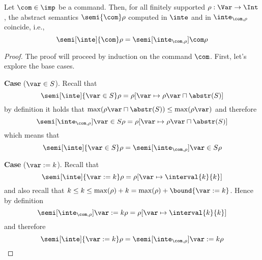
\begin{lemma}
  Let \(\com\in \imp\) be a command. Then, for all finitely supported
  \(\rho : \Var \to \Int\), the abstract semantics
  \(\semi{\com} \rho \)
  computed in \(\inte\) and in \(\inte_{\com,\rho}\)
  coincide, i.e., 
  \begin{equation*}
    \semi[\inte]{\com}\rho = \semi[\inte_{\com,\rho}]{\com}\rho
  \end{equation*}
\end{lemma}

\begin{proof}
  The proof will proceed by induction on the command \(\com\). First,
  let's explore the base cases.

  \medskip

  \textbf{Case} (\(\var \in S\)).
  Recall that
  \begin{equation*}
    \semi[\inte]{\var\in S}\rho = \rho[\var \mapsto \rho\var \sqcap \abstr(S)]
  \end{equation*}
  by definition it holds that
  \(\max(\rho\var \sqcap \abstr(S)) \leq \max(\rho\var)\) and
  therefore
  \begin{equation*}
    \semi[\inte_{\com,\rho}]{\var\in S}\rho = \rho[\var \mapsto \rho\var \sqcap \abstr(S)]
  \end{equation*}
  which means that
  \begin{equation*}
    \semi[\inte]{\var\in S}\rho = \semi[\inte_{\com,\rho}]{\var\in S}\rho
  \end{equation*}

  \medskip

  \noindent
  \textbf{Case} (\(\var := k\)).
  Recall that
  \begin{equation*}
    \semi[\inte]{\var := k}\rho = \rho[\var \mapsto \interval{k}{k}]
  \end{equation*}
  and also recall that
  \(k \leq k \leq \max(\rho) + k = \max(\rho) + \bound{\var :=
    k}\). Hence by definition
  \begin{equation*}
    \semi[\inte_{\com,\rho}]{\var := k}\rho = \rho[\var \mapsto \interval{k}{k}]
  \end{equation*}
  and therefore
  \begin{equation*}
    \semi[\inte]{\var := k}\rho = \semi[\inte_{\com,\rho}]{\var := k}\rho
  \end{equation*}


\end{proof}
